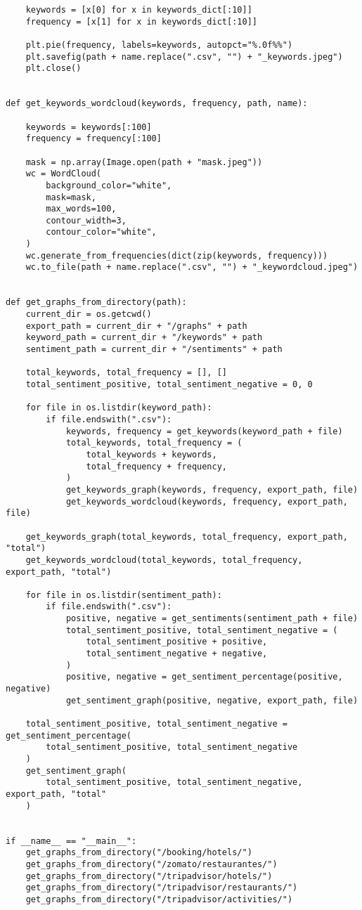 \begin{verbatim}
    keywords = [x[0] for x in keywords_dict[:10]]
    frequency = [x[1] for x in keywords_dict[:10]]

    plt.pie(frequency, labels=keywords, autopct="%.0f%%")
    plt.savefig(path + name.replace(".csv", "") + "_keywords.jpeg")
    plt.close()


def get_keywords_wordcloud(keywords, frequency, path, name):

    keywords = keywords[:100]
    frequency = frequency[:100]

    mask = np.array(Image.open(path + "mask.jpeg"))
    wc = WordCloud(
        background_color="white",
        mask=mask,
        max_words=100,
        contour_width=3,
        contour_color="white",
    )
    wc.generate_from_frequencies(dict(zip(keywords, frequency)))
    wc.to_file(path + name.replace(".csv", "") + "_keywordcloud.jpeg")


def get_graphs_from_directory(path):
    current_dir = os.getcwd()
    export_path = current_dir + "/graphs" + path
    keyword_path = current_dir + "/keywords" + path
    sentiment_path = current_dir + "/sentiments" + path

    total_keywords, total_frequency = [], []
    total_sentiment_positive, total_sentiment_negative = 0, 0

    for file in os.listdir(keyword_path):
        if file.endswith(".csv"):
            keywords, frequency = get_keywords(keyword_path + file)
            total_keywords, total_frequency = (
                total_keywords + keywords,
                total_frequency + frequency,
            )
            get_keywords_graph(keywords, frequency, export_path, file)
            get_keywords_wordcloud(keywords, frequency, export_path, file)

    get_keywords_graph(total_keywords, total_frequency, export_path, "total")
    get_keywords_wordcloud(total_keywords, total_frequency, export_path, "total")

    for file in os.listdir(sentiment_path):
        if file.endswith(".csv"):
            positive, negative = get_sentiments(sentiment_path + file)
            total_sentiment_positive, total_sentiment_negative = (
                total_sentiment_positive + positive,
                total_sentiment_negative + negative,
            )
            positive, negative = get_sentiment_percentage(positive, negative)
            get_sentiment_graph(positive, negative, export_path, file)

    total_sentiment_positive, total_sentiment_negative = get_sentiment_percentage(
        total_sentiment_positive, total_sentiment_negative
    )
    get_sentiment_graph(
        total_sentiment_positive, total_sentiment_negative, export_path, "total"
    )


if __name__ == "__main__":
    get_graphs_from_directory("/booking/hotels/")
    get_graphs_from_directory("/zomato/restaurantes/")
    get_graphs_from_directory("/tripadvisor/hotels/")
    get_graphs_from_directory("/tripadvisor/restaurants/")
    get_graphs_from_directory("/tripadvisor/activities/")

\end{verbatim}
